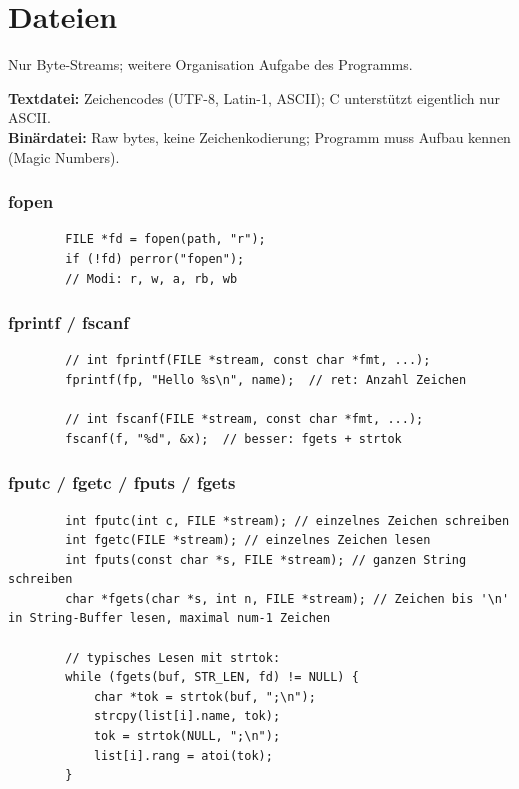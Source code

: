 \documentclass[a4paper,9pt]{article}
\begin{document}
	\tableofcontents
	\newpage
	
	\section{Dateien}
	Nur Byte-Streams; weitere Organisation Aufgabe des Programms.
	
	\textbf{Textdatei:} Zeichencodes (UTF-8, Latin-1, ASCII); C unterstützt eigentlich nur ASCII.\\
	\textbf{Binärdatei:} Raw bytes, keine Zeichenkodierung; Programm muss Aufbau kennen (Magic Numbers).
	
	\subsubsection{fopen}
	\begin{lstlisting}
		FILE *fd = fopen(path, "r");
		if (!fd) perror("fopen");
		// Modi: r, w, a, rb, wb
	\end{lstlisting}
	
	\subsubsection{fprintf / fscanf}
	\begin{lstlisting}
		// int fprintf(FILE *stream, const char *fmt, ...);
		fprintf(fp, "Hello %s\n", name);  // ret: Anzahl Zeichen
		
		// int fscanf(FILE *stream, const char *fmt, ...);
		fscanf(f, "%d", &x);  // besser: fgets + strtok
	\end{lstlisting}
	
	\subsubsection{fputc / fgetc / fputs / fgets}
	\begin{lstlisting}
		int fputc(int c, FILE *stream); // einzelnes Zeichen schreiben
		int fgetc(FILE *stream); // einzelnes Zeichen lesen
		int fputs(const char *s, FILE *stream); // ganzen String schreiben
		char *fgets(char *s, int n, FILE *stream); // Zeichen bis '\n' in String-Buffer lesen, maximal num-1 Zeichen
		
		// typisches Lesen mit strtok:
		while (fgets(buf, STR_LEN, fd) != NULL) {
			char *tok = strtok(buf, ";\n");
			strcpy(list[i].name, tok);
			tok = strtok(NULL, ";\n");
			list[i].rang = atoi(tok);
		}
	\end{lstlisting}
	
\end{document}
